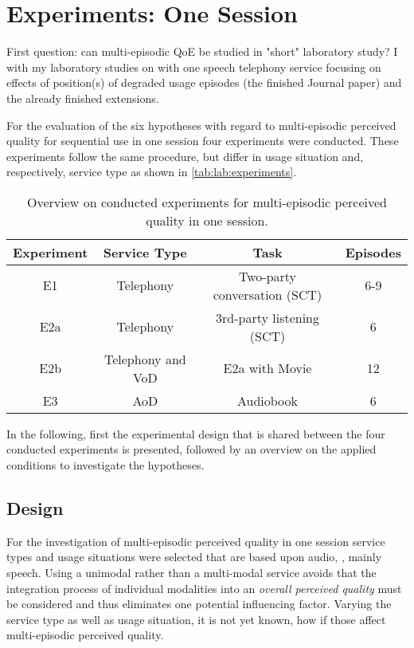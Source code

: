 \chapter{Experiments: One Session}\label{chap:lab}
\begin{chapter-abstract}
First question: can multi-episodic QoE be studied in "short" laboratory study?
I with my laboratory studies on with one speech telephony service focusing on effects of position(s) of degraded usage episodes (the finished Journal paper) and the already finished extensions.
\end{chapter-abstract}

For the evaluation of the six hypotheses with regard to multi-episodic perceived quality for sequential use in one session four experiments were conducted.
These experiments follow the same procedure, but differ in usage situation and, respectively, service type as shown in \autoref{tab:lab:experiments}.

\begin{table}[h]
	\begin{tabulary}{\textwidth}{C|C|C|C}
	Experiment	& Service Type 				& Task								& Episodes \\
	\hline
	E1			& Telephony					& Two-party conversation (\ac{SCT})	& 6-9 \\
	\hline
	E2a			& Telephony					& 3rd-party listening (\ac{SCT})	& 6 \\
	\hline
	E2b			& Telephony and \ac{VoD}	& E2a with Movie					& 12 \\
	\hline
	E3			& \ac{AoD}					& Audiobook							& 6 \\
	\end{tabulary}
	\caption{Overview on conducted experiments for multi-episodic perceived quality in one session.}
	\label{tab:lab:experiments}
\end{table}

In the following, first the experimental design that is shared between the four conducted experiments is presented, followed by an overview on the applied conditions to investigate the hypotheses.

\section{Design}
For the investigation of multi-episodic perceived quality in one session service types and usage situations were selected that are based upon audio, \ie, mainly speech.
Using a unimodal rather than a multi-modal service avoids that the integration process of individual modalities into an \emph{overall perceived quality} must be considered and thus eliminates one potential influencing factor.
Varying the service type as well as usage situation, it is not yet known, how if those affect multi-episodic perceived quality.

